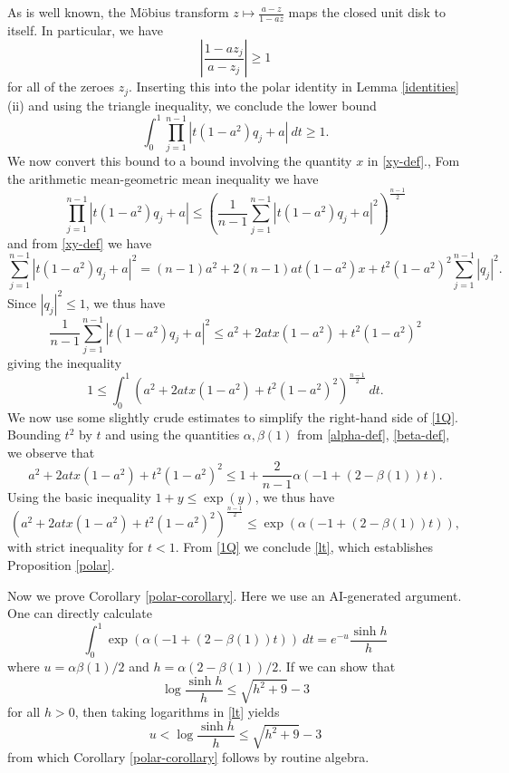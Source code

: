 \documentclass[12pt]{article}
\begin{document}
As is well known, the M\"obius transform $z \mapsto \frac{a-z}{1-az}$ maps the closed unit disk to itself.  In particular, we have
$$ |\frac{1-az_j}{a-z_j}| \geq 1$$
for all of the zeroes $z_j$. Inserting this into the polar identity in Lemma \ref{identities}(ii) and using the triangle inequality, we conclude the lower bound
$$ \int_0^1 \prod_{j=1}^{n-1} |t (1-a^2) q_j + a|\ dt \geq 1.$$
We now convert this bound to a bound involving the quantity $x$ in \eqref{xy-def}., Fom the arithmetic mean-geometric mean inequality we have
\begin{equation}\label{amgm} \prod_{j=1}^{n-1} |t (1-a^2) q_j + a| \leq (\frac{1}{n-1} \sum_{j=1}^{n-1} |t (1-a^2) q_j + a|^2)^{\frac{n-1}{2}}
\end{equation}
and from \eqref{xy-def} we have
$$\sum_{j=1}^{n-1} |t (1-a^2) q_j + a|^2 = (n-1) a^2 + 2 (n-1) a t (1-a^2) x + t^2 (1-a^2)^2 \sum_{j=1}^{n-1} |q_j|^2.$$
Since $|q_j|^2 \leq 1$, we thus have
\begin{equation}\label{quad}
 \frac{1}{n-1} \sum_{j=1}^{n-1} |t (1-a^2) q_j + a|^2 \leq a^2 + 2 a t x (1-a^2) + t^2 (1-a^2)^2
\end{equation}
giving the inequality
\begin{equation}\label{1Q}
1 \leq \int_0^1 (a^2 + 2 a t x (1-a^2) + t^2 (1-a^2)^2)^{\frac{n-1}{2}}\ dt.
\end{equation}
We now use some slightly crude estimates to simplify the right-hand side of \eqref{1Q}.
Bounding $t^2$ by $t$ and using the quantities $\alpha,\beta(1)$ from \eqref{alpha-def}, \eqref{beta-def}, we observe that
\begin{equation}\label{at}
 a^2 + 2 a t x (1-a^2) + t^2 (1-a^2)^2 \leq
1 + \frac{2}{n-1} \alpha (-1 + (2-\beta(1)) t).
\end{equation}
Using the basic inequality $1 + y \leq \exp(y)$, we thus have
$$ (a^2 + 2 a t x (1-a^2) + t^2 (1-a^2)^2)^{\frac{n-1}{2}} \leq \exp ( \alpha (-1 + (2-\beta(1)) t)),$$
with strict inequality for $t < 1$. From \eqref{1Q} we conclude \eqref{lt}, which establishes Proposition \ref{polar}.

Now we prove Corollary \ref{polar-corollary}.  Here we use an AI-generated argument. One can directly calculate
$$ \int_0^1 \exp ( \alpha (-1 + (2-\beta(1)) t))\ dt = e^{-u} \frac{\sinh h}{h}$$
where $u = \alpha \beta(1)/2$ and $h = \alpha (2-\beta(1))/2$.  If we can show that
\begin{equation}\label{lsh}
 \log \frac{\sinh h}{h} \leq \sqrt{h^2+9} - 3
\end{equation}
for all $h > 0$, then taking logarithms in \eqref{lt} yields
$$ u < \log \frac{\sinh h}{h} \leq \sqrt{h^2+9} - 3$$
from which Corollary \ref{polar-corollary} follows by routine algebra.
\end{document}
